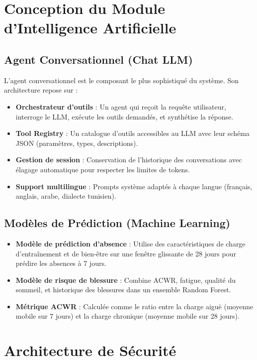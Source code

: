 \section{Conception du Module d'Intelligence Artificielle}

\subsection{Agent Conversationnel (Chat LLM)}

L'agent conversationnel est le composant le plus sophistiqué du système. Son architecture repose sur :

\begin{itemize}
    \item \textbf{Orchestrateur d'outils} : Un agent qui reçoit la requête utilisateur, interroge le LLM, exécute les outils demandés, et synthétise la réponse.
    \item \textbf{Tool Registry} : Un catalogue d'outils accessibles au LLM avec leur schéma JSON (paramètres, types, descriptions).
    \item \textbf{Gestion de session} : Conservation de l'historique des conversations avec élagage automatique pour respecter les limites de tokens.
    \item \textbf{Support multilingue} : Prompts système adaptés à chaque langue (français, anglais, arabe, dialecte tunisien).
\end{itemize}

\subsection{Modèles de Prédiction (Machine Learning)}

\begin{itemize}
    \item \textbf{Modèle de prédiction d'absence} : Utilise des caractéristiques de charge d'entraînement et de bien-être sur une fenêtre glissante de 28 jours pour prédire les absences à 7 jours.
    \item \textbf{Modèle de risque de blessure} : Combine ACWR, fatigue, qualité du sommeil, et historique des blessures dans un ensemble Random Forest.
    \item \textbf{Métrique ACWR} : Calculée comme le ratio entre la charge aiguë (moyenne mobile sur 7 jours) et la charge chronique (moyenne mobile sur 28 jours).
\end{itemize}

\section{Architecture de Sécurité}

